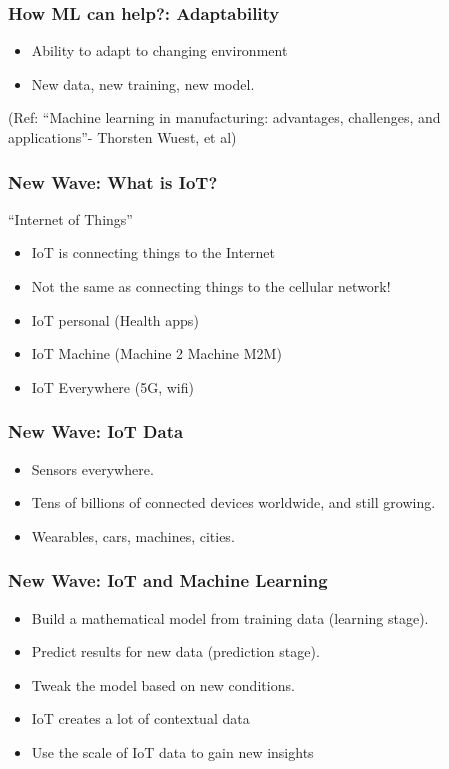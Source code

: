 \begin{frame}[fragile]\frametitle{How ML can help?: Adaptability}

\begin{itemize}
\item Ability to adapt to changing environment
\item New data, new training, new model.
\end{itemize}
{\tiny (Ref: ``Machine learning in manufacturing: advantages, challenges, and applications''- Thorsten Wuest, et al)}
\end{frame}

\begin{frame}[fragile]\frametitle{New Wave: What is IoT?}
``Internet of Things''
\begin{itemize}
\item IoT is connecting things to the Internet
\item Not the same as connecting things to the cellular network!
\item IoT personal (Health apps)
\item IoT Machine (Machine 2 Machine M2M)
\item IoT Everywhere (5G, wifi)
\end{itemize}
\end{frame}

\begin{frame}[fragile]\frametitle{New Wave: IoT Data}
\begin{itemize}
\item Sensors everywhere.
\item Tens of billions of connected devices worldwide, and still growing.
\item Wearables, cars, machines, cities.
\end{itemize}
\end{frame}

\begin{frame}[fragile]\frametitle{New Wave: IoT and Machine Learning}
\begin{itemize}
\item Build a mathematical model from training data (learning stage).
\item Predict results for new data (prediction stage).
\item Tweak the model based on new conditions.
\item IoT creates a lot of contextual data
\item Use the scale of IoT data to gain new insights
\end{itemize}
\end{frame}

